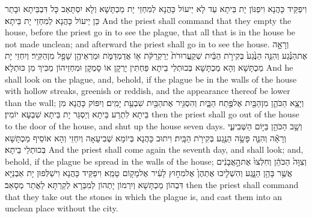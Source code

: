 {וִיפַקֵּיד כָּהֲנָא וִיפַנּוֹן יָת בֵּיתָא עַד לָא יֵיעוֹל כָּהֲנָא לְמִחְזֵי יָת מַכְתָּשָׁא וְלָא יִסְתָּאַב כָּל דִּבְבֵּיתָא וּבָתַר כֵּן יֵיעוֹל כָּהֲנָא לְמִחְזֵי יָת בֵּיתָא׃}
{And the priest shall command that they empty the house, before the priest go in to see the plague, that all that is in the house be not made unclean; and afterward the priest shall go in to see the house.}{}
{וְרָאָ֣ה אֶת\maqqaf הַנֶּ֗גַע וְהִנֵּ֤ה הַנֶּ֙גַע֙ בְּקִירֹ֣ת הַבַּ֔יִת שְׁקַֽעֲרוּרֹת֙ יְרַקְרַקֹּ֔ת א֖וֹ אֲדַמְדַּמֹּ֑ת וּמַרְאֵיהֶ֥ן שָׁפָ֖ל מִן\maqqaf הַקִּֽיר׃}
{וְיִחְזֵי יָת מַכְתָּשָׁא וְהָא מַכְתָּשָׁא בְּכוּתְלֵי בֵיתָא פַּחְתִּין יָרְקָן אוֹ סָמְקָן וּמִחְזֵיהוֹן מַכִּיךְ מִן כּוּתְלָא׃}
{And he shall look on the plague, and, behold, if the plague be in the walls of the house with hollow streaks, greenish or reddish, and the appearance thereof be lower than the wall;}{}
{וְיָצָ֧א הַכֹּהֵ֛ן מִן\maqqaf הַבַּ֖יִת אֶל\maqqaf פֶּ֣תַח הַבָּ֑יִת וְהִסְגִּ֥יר אֶת\maqqaf הַבַּ֖יִת שִׁבְעַ֥ת יָמִֽים׃}
{וְיִפּוֹק כָּהֲנָא מִן בֵּיתָא לִתְרַע בֵּיתָא וְיַסְגַּר יָת בֵּיתָא שִׁבְעָא יוֹמִין׃}
{then the priest shall go out of the house to the door of the house, and shut up the house seven days.}{}
{וְשָׁ֥ב הַכֹּהֵ֖ן בַּיּ֣וֹם הַשְּׁבִיעִ֑י וְרָאָ֕ה וְהִנֵּ֛ה פָּשָׂ֥ה הַנֶּ֖גַע בְּקִירֹ֥ת הַבָּֽיִת׃}
{וִיתוּב כָּהֲנָא בְּיוֹמָא שְׁבִיעָאָה וְיִחְזֵי וְהָא אוֹסֵיף מַכְתָּשָׁא בְּכוּתְלֵי בֵיתָא׃}
{And the priest shall come again the seventh day, and shall look; and, behold, if the plague be spread in the walls of the house;}{}
{וְצִוָּה֙ הַכֹּהֵ֔ן וְחִלְּצוּ֙ אֶת\maqqaf הָ֣אֲבָנִ֔ים אֲשֶׁ֥ר בָּהֵ֖ן הַנָּ֑גַע וְהִשְׁלִ֤יכוּ אֶתְהֶן֙ אֶל\maqqaf מִח֣וּץ לָעִ֔יר אֶל\maqqaf מָק֖וֹם טָמֵֽא׃}
{וִיפַקֵּיד כָּהֲנָא וִישַׁלְּפוּן יָת אַבְנַיָּא דִּבְהוֹן מַכְתָּשָׁא וְיִרְמוֹן יָתְהוֹן לְמִבַּרָא לְקַרְתָּא לַאֲתַר מְסָאַב׃}
{then the priest shall command that they take out the stones in which the plague is, and cast them into an unclean place without the city.}{}
